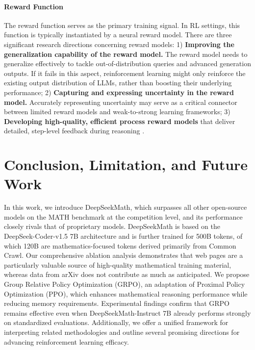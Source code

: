 \begin{itemize}[topsep=0pt]
\begin{itemize}[topsep=0pt]
\paragraph{Reward Function} The reward function serves as the primary training signal. In RL settings, this function is typically instantiated by a neural reward model. There are three significant research directions concerning reward models: 1) \textbf{Improving the generalization capability of the reward model.} The reward model needs to generalize effectively to tackle out-of-distribution queries and advanced generation outputs. If it fails in this aspect, reinforcement learning might only reinforce the existing output distribution of LLMs, rather than boosting their underlying performance; 2) \textbf{Capturing and expressing uncertainty in the reward model.} Accurately representing uncertainty may serve as a critical connector between limited reward models and weak-to-strong learning frameworks; 3) \textbf{Developing high-quality, efficient process reward models} that deliver detailed, step-level feedback during reasoning \citep{lightman2023let,wang2023math}.

\section{Conclusion, Limitation, and Future Work}

In this work, we introduce DeepSeekMath, which surpasses all other open-source models on the MATH benchmark at the competition level, and its performance closely rivals that of proprietary models. DeepSeekMath is based on the DeepSeek-Coder-v1.5 7B architecture and is further trained for 500B tokens, of which 120B are mathematics-focused tokens derived primarily from Common Crawl. Our comprehensive ablation analysis demonstrates that web pages are a particularly valuable source of high-quality mathematical training material, whereas data from arXiv does not contribute as much as anticipated. We propose Group Relative Policy Optimization (GRPO), an adaptation of Proximal Policy Optimization (PPO), which enhances mathematical reasoning performance while reducing memory requirements. Experimental findings confirm that GRPO remains effective even when DeepSeekMath-Instruct 7B already performs strongly on standardized evaluations. Additionally, we offer a unified framework for interpreting related methodologies and outline several promising directions for advancing reinforcement learning efficacy.


\end{itemize}
\end{itemize}
